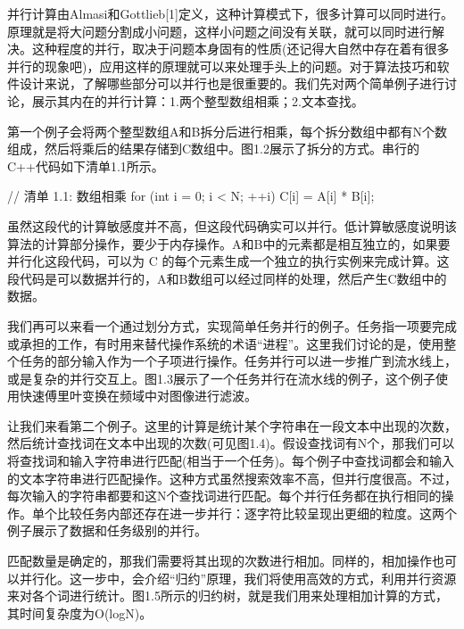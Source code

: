 并行计算由Almasi和Gottlieb[1]定义，这种计算模式下，很多计算可以同时进行。原理就是将大问题分割成小问题，这样小问题之间没有关联，就可以同时进行解决。这种程度的并行，取决于问题本身固有的性质(还记得大自然中存在着有很多并行的现象吧)，应用这样的原理就可以来处理手头上的问题。对于算法技巧和软件设计来说，了解哪些部分可以并行也是很重要的。我们先对两个简单例子进行讨论，展示其内在的并行计算：1.两个整型数组相乘；2.文本查找。

第一个例子会将两个整型数组A和B拆分后进行相乘，每个拆分数组中都有N个数组成，然后将乘后的结果存储到C数组中。图1.2展示了拆分的方式。串行的C++代码如下清单1.1所示。


\begin{codebox}[cpp]
// 清单 1.1: 数组相乘
for (int i = 0; i < N; ++i){
  C[i] = A[i] * B[i];
}
\end{codebox}

虽然这段代的计算敏感度并不高，但这段代码确实可以并行。低计算敏感度说明该算法的计算部分操作，要少于内存操作。A和B中的元素都是相互独立的，如果要并行化这段代码，可以为 C 的每个元素生成一个独立的执行实例来完成计算。这段代码是可以数据并行的，A和B数组可以经过同样的处理，然后产生C数组中的数据。

我们再可以来看一个通过划分方式，实现简单任务并行的例子。任务指一项要完成或承担的工作，有时用来替代操作系统的术语“进程”。这里我们讨论的是，使用整个任务的部分输入作为一个子项进行操作。任务并行可以进一步推广到流水线上，或是复杂的并行交互上。图1.3展示了一个任务并行在流水线的例子，这个例子使用快速傅里叶变换在频域中对图像进行滤波。


让我们来看第二个例子。这里的计算是统计某个字符串在一段文本中出现的次数，然后统计查找词在文本中出现的次数(可见图1.4)。假设查找词有N个，那我们可以将查找词和输入字符串进行匹配(相当于一个任务)。每个例子中查找词都会和输入的文本字符串进行匹配操作。这种方式虽然搜索效率不高，但并行度很高。不过，每次输入的字符串都要和这N个查找词进行匹配。每个并行任务都在执行相同的操作。单个比较任务内部还存在进一步并行：逐字符比较呈现出更细的粒度。这两个例子展示了数据和任务级别的并行。


匹配数量是确定的，那我们需要将其出现的次数进行相加。同样的，相加操作也可以并行化。这一步中，会介绍“归约”原理，我们将使用高效的方式，利用并行资源来对各个词进行统计。图1.5所示的归约树，就是我们用来处理相加计算的方式，其时间复杂度为O(logN)。

